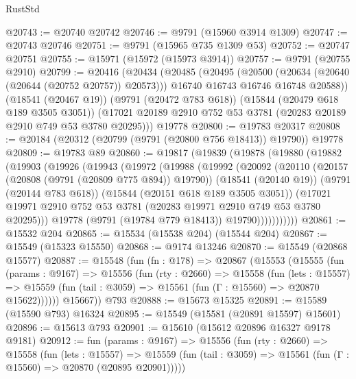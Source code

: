 \begin{lexlean}{RustStd}
\begin{coremodule}
@20743 := @20740 @20742
@20746 := @9791 (@15960 @3914 @1309)
@20747 := @20743 @20746
@20751 := @9791 (@15965 @735 @1309 @53)
@20752 := @20747 @20751
@20755 := @15971 (@15972 (@15973 @3914))
@20757 := @9791 (@20755 @2910)
@20799 := @20416
    (@20434
      (@20485
        (@20495
          (@20500 (@20634 (@20640 (@20644 (@20752 @20757)) @20573)))
          @16740
          @16743
          @16746
          @16748
          @20588))
      (@18541 (@20467 @19))
      (@9791 (@20472 @783 @618))
      (@15844 (@20479 @618 @189 @3505 @3051))
      (@17021 @20189 @2910 @752 @53 @3781 (@20283 @20189 @2910 @749 @53 @3780 @20295)))
    @19778
@20800 := @19783 @20317
@20808 := @20184 (@20312 (@20799 (@9791 (@20800 @756 @18413)) @19790)) @19778
@20809 := @19783 @89
@20860 := @19817
    (@19839
      (@19878
        (@19880
          (@19882
            (@19903
              (@19926
                (@19943
                  (@19972
                    (@19988
                      (@19992
                        (@20092
                          (@20110
                            (@20157 (@20808 (@9791 (@20809 @775 @894)) @19790))
                            (@18541 (@20140 @19))
                            (@9791 (@20144 @783 @618))
                            (@15844 (@20151 @618 @189 @3505 @3051))
                            (@17021
                              @19971
                              @2910
                              @752
                              @53
                              @3781
                              (@20283 @19971 @2910 @749 @53 @3780 @20295)))
                          @19778
                          (@9791 (@19784 @779 @18413))
                          @19790)))))))))))
@20861 := @15532 @204
@20865 := @15534 (@15538 @204) (@15544 @204)
@20867 := @15549 (@15323 @15550)
@20868 := @9174 @13246
@20870 := @15549 (@20868 @15577)
@20887 := @15548
    (fun (fn : @178) =>
    @20867
      (@15553
        (@15555
          (fun (params : @9167) =>
          @15556
            (fun (rty : @2660) =>
            @15558
              (fun (lets : @15557) =>
              @15559 (fun (tail : @3059) => @15561 (fun (Γ : @15560) => @20870 @15622))))))
        @15667))
    @793
@20888 := @15673 @15325
@20891 := @15589 (@15590 @793) @16324
@20895 := @15549 (@15581 (@20891 @15597) @15601)
@20896 := @15613 @793
@20901 := @15610 (@15612 @20896 @16327 @9178 @9181)
@20912 := fun (params : @9167) =>
  @15556
    (fun (rty : @2660) =>
    @15558
      (fun (lets : @15557) =>
      @15559 (fun (tail : @3059) => @15561 (fun (Γ : @15560) => @20870 (@20895 @20901)))))

\end{coremodule}
\end{lexlean}

